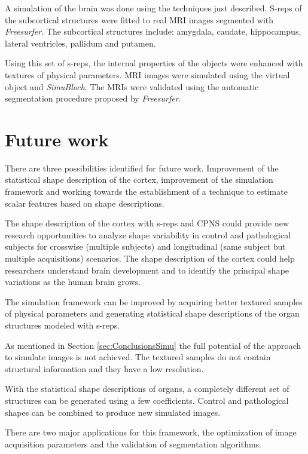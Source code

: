 A simulation of the brain was done using 
the techniques just described. 
S-reps of the subcortical structures were fitted 
to real MRI images segmented with \textit{Freesurfer}.
The subcortical structures include: amygdala, caudate, hippocampus, lateral ventricles, pallidum and putamen.

Using this set of s-reps, 
the internal properties of the objects were enhanced 
with textures of physical parameters. 
MRI images were simulated using the virtual object and \textit{SimuBloch}. 
The MRIs were validated using the automatic segmentation 
procedure proposed by \textit{Freesurfer}.

\section{Future work}

There are three possibilities identified for future work.
Improvement of the statistical shape description of the cortex, 
improvement of the simulation framework
and working towards the establishment of a technique 
to estimate scalar features based on shape descriptions.

The shape description of the cortex 
with s-reps and CPNS could
provide new research opportunities to
analyze shape variability in control and pathological subjects for crosswise (multiple subjects)
and longitudinal (same subject but multiple acquisitions) scenarios.
The shape description of the cortex could help researchers understand 
brain development and to identify the principal shape variations as the human brain grows. 

The simulation framework can be improved 
by acquiring better textured samples of physical parameters 
and generating statistical shape descriptions of the organ structures 
modeled with s-reps.

As mentioned in Section \ref{sec:ConclusionsSimu} the full potential of 
the approach to simulate images is not achieved. The textured samples 
do not contain structural information and they have a low resolution. 

With the statistical shape descriptions of organs, 
a completely different set of structures can be generated
using a few coefficients.
Control and pathological shapes can be combined to produce new simulated images.

There are two major applications for this framework, 
the optimization of image acquisition parameters 
and the validation of segmentation algorithms.

